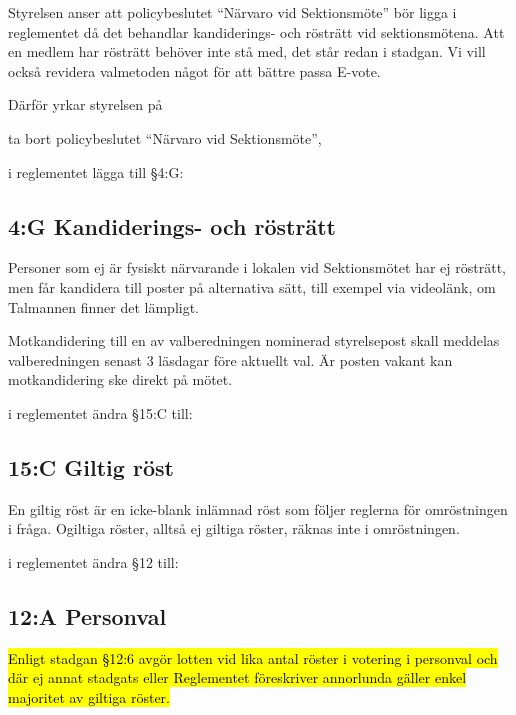 \documentclass[../_main/handlingar.tex]{subfiles}
\begin{document}

Styrelsen anser att policybeslutet ``Närvaro vid Sektionsmöte'' bör ligga i reglementet då det behandlar kandiderings- och rösträtt vid sektionsmötena. Att en medlem har rösträtt behöver inte stå med, det står redan i stadgan. Vi vill också revidera valmetoden något för att bättre passa E-vote.

Därför yrkar styrelsen på

\begin{attsatser}
    \att ta bort policybeslutet ``Närvaro vid Sektionsmöte'',

    \att i reglementet lägga till \S4:G:\par
        \subsection*{4:G Kandiderings- och rösträtt}
        Personer som ej är fysiskt närvarande i lokalen vid Sektionsmötet har ej rösträtt, men får kandidera till poster på alternativa sätt, till exempel via videolänk, om Talmannen finner det lämpligt.

        Motkandidering till en av valberedningen nominerad styrelsepost skall meddelas valberedningen senast 3 läsdagar före aktuellt val. Är posten vakant kan motkandidering ske direkt på mötet.

    \att i reglementet ändra \S15:C till:\par
        \subsection*{15:C Giltig röst}
        En giltig röst är en icke-blank inlämnad röst som följer reglerna för omröstningen i fråga. Ogiltiga röster, alltså ej giltiga röster, räknas inte i omröstningen.

    \newpage

    \att i reglementet ändra \S12 till:\par
        \subsection{12:A Personval}

        \hl{Enligt stadgan \S12:6 avgör lotten vid lika antal röster i votering i personval och där ej annat stadgats eller Reglementet föreskriver annorlunda gäller enkel majoritet av giltiga röster.}


\end{attsatser}
\end{document}
